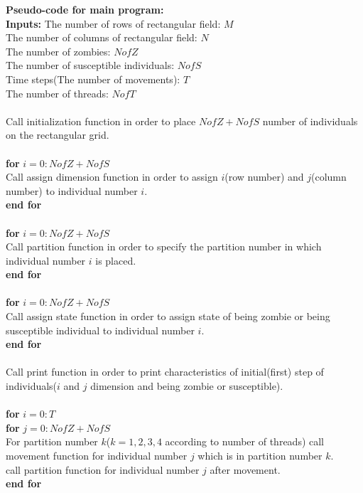 \documentclass[12pt]{article}
\newcommand\tab[1][1cm]{\hspace*{#1}}
\begin{document}
\textbf{Pseudo-code for main program:}\\
\textbf{Inputs:} The number of rows of rectangular field: $M$\\
The number of columns of rectangular field: $N$\\
The number of zombies: $NofZ$\\
The number of susceptible individuals: $NofS$\\
Time steps(The number of movements): $T$\\
The number of threads: $NofT$\\\\
Call initialization function in order to place $NofZ+NofS$ number of individuals on the rectangular grid.\\\\
\textbf{for} $i=0:NofZ+NofS$\\
\tab Call assign dimension function in order to assign $i$(row number) and \tab $j$(column number) to individual number $i$.\\
\textbf{end for}\\\\
\textbf{for} $i=0:NofZ+NofS$\\
\tab Call partition function in order to specify the partition number in which \tab individual number $i$ is placed.\\
\textbf{end for}\\\\
\textbf{for} $i=0:NofZ+NofS$\\
\tab Call assign state function in order to assign state of being zombie or \tab being susceptible individual to individual number $i$.\\
\textbf{end for}\\\\
Call print function in order to print characteristics of initial(first) step of individuals($i$ and $j$ dimension and being zombie or susceptible).\\\\
\textbf{for} $i=0:T$\\
\tab \textbf{for} $j=0:NofZ+NofS$\\
\tab \tab For partition number $k$($k=1,2,3,4$ according to number of \tab \tab threads) call movement function for individual number $j$ which \tab \tab is in partition number $k$. \\
\tab \tab call partition function for individual number $j$ after movement.\\
\tab \textbf{end for}\\
\end{document}
